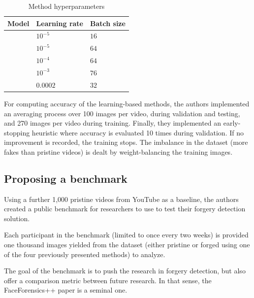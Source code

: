 \documentclass{article} %
\begin{document}
\begin{table}[h!]
\centering
\begin{tabular}{ |p{4cm}|p{3cm}|p{3cm}|}
 \hline
 \textbf{Model} & \textbf{Learning rate} & \textbf{Batch size} \\
 \hline
 \cite{10.1145/3082031.3083247} & $10^{-5}$ & $16$ \\
 \cite{8335799} & $10^{-5}$ & $64$ \\
 \cite{8267647} & $10^{-4}$ & $64$ \\
 \cite{8630761} & $10^{-3}$ & $76$ \\
 \cite{8099678} & $0.0002$ & $32$ \\
 \hline
\end{tabular}
\caption{Method hyperparameters}
\end{table}

For computing accuracy of the learning-based methods, the authors implemented an averaging process over 100 images per video, during validation and testing, and 270 images per video during training. Finally, they implemented an early-stopping heuristic where accuracy is evaluated 10 times during validation. If no improvement is recorded, the training stops. The imbalance in the dataset (more fakes than pristine videos) is dealt by weight-balancing the training images.

\subsection{Proposing a benchmark}
 
Using a further 1,000 pristine videos from YouTube as a baseline, the authors created a public benchmark for researchers to use to test their forgery detection solution.

Each participant in the benchmark (limited to once every two weeks) is provided one thousand images yielded from the dataset (either pristine or forged using one of the four previously presented methods) to analyze.

The goal of the benchmark is to push the research in forgery detection, but also offer a comparison metric between future research. In that sense, the FaceForensics++ paper is a seminal one.
\end{document}
